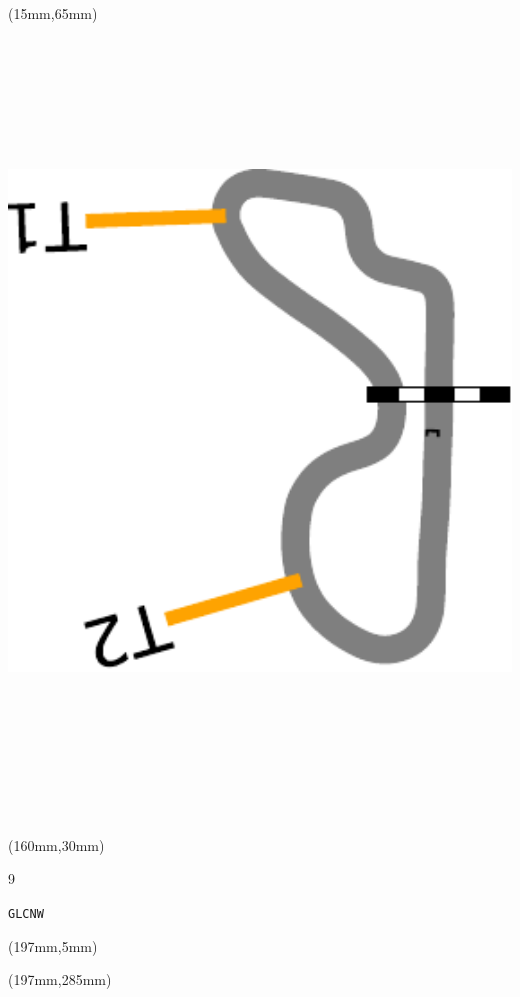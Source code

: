 \begin{textblock*}{185mm}(15mm,65mm)%
\centering
\mbox{\includegraphics[width=185mm,height=210mm,keepaspectratio]{PT/GLCNW.pdf}}
\end{textblock*}
\begin{textblock*}{40mm}(160mm,30mm)%
\Large
\par{} 
\par9 
\par\hfill\tiny\tt GLCNW\\
\end{textblock*}
\begin{textblock*}{20mm}(197mm,5mm)%
\fbox{\thepage}
\label{GLCNW}
\end{textblock*}
\begin{textblock*}{20mm}(197mm,285mm)%
\fbox{\thepage}
\end{textblock*}

